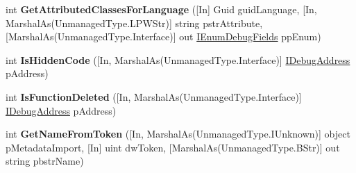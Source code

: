 \begin{DoxyCompactItemize}
\item 
\hypertarget{interface_microsoft_1_1_visual_studio_1_1_debugger_1_1_interop_e_e_1_1_i_debug_com_plus_symbol_provider_a0364f9bf56002f9768eb31fe6b69cfee}{int {\bfseries Get\+Attributed\+Classes\+For\+Language} (\mbox{[}In\mbox{]} Guid guid\+Language, \mbox{[}In, Marshal\+As(Unmanaged\+Type.\+L\+P\+W\+Str)\mbox{]} string pstr\+Attribute, \mbox{[}Marshal\+As(Unmanaged\+Type.\+Interface)\mbox{]} out \hyperlink{interface_microsoft_1_1_visual_studio_1_1_debugger_1_1_interop_e_e_1_1_i_enum_debug_fields}{I\+Enum\+Debug\+Fields} pp\+Enum)}\label{interface_microsoft_1_1_visual_studio_1_1_debugger_1_1_interop_e_e_1_1_i_debug_com_plus_symbol_provider_a0364f9bf56002f9768eb31fe6b69cfee}

\item 
\hypertarget{interface_microsoft_1_1_visual_studio_1_1_debugger_1_1_interop_e_e_1_1_i_debug_com_plus_symbol_provider_a13a45066914bd23fd6bf565db2a4e9d3}{int {\bfseries Is\+Hidden\+Code} (\mbox{[}In, Marshal\+As(Unmanaged\+Type.\+Interface)\mbox{]} \hyperlink{interface_microsoft_1_1_visual_studio_1_1_debugger_1_1_interop_e_e_1_1_i_debug_address}{I\+Debug\+Address} p\+Address)}\label{interface_microsoft_1_1_visual_studio_1_1_debugger_1_1_interop_e_e_1_1_i_debug_com_plus_symbol_provider_a13a45066914bd23fd6bf565db2a4e9d3}

\item 
\hypertarget{interface_microsoft_1_1_visual_studio_1_1_debugger_1_1_interop_e_e_1_1_i_debug_com_plus_symbol_provider_ad88d5656edfe7c762bbac83290fafec1}{int {\bfseries Is\+Function\+Deleted} (\mbox{[}In, Marshal\+As(Unmanaged\+Type.\+Interface)\mbox{]} \hyperlink{interface_microsoft_1_1_visual_studio_1_1_debugger_1_1_interop_e_e_1_1_i_debug_address}{I\+Debug\+Address} p\+Address)}\label{interface_microsoft_1_1_visual_studio_1_1_debugger_1_1_interop_e_e_1_1_i_debug_com_plus_symbol_provider_ad88d5656edfe7c762bbac83290fafec1}

\item 
\hypertarget{interface_microsoft_1_1_visual_studio_1_1_debugger_1_1_interop_e_e_1_1_i_debug_com_plus_symbol_provider_a2470220c7dc74e5a33dcca6ddd420598}{int {\bfseries Get\+Name\+From\+Token} (\mbox{[}In, Marshal\+As(Unmanaged\+Type.\+I\+Unknown)\mbox{]} object p\+Metadata\+Import, \mbox{[}In\mbox{]} uint dw\+Token, \mbox{[}Marshal\+As(Unmanaged\+Type.\+B\+Str)\mbox{]} out string pbstr\+Name)}\label{interface_microsoft_1_1_visual_studio_1_1_debugger_1_1_interop_e_e_1_1_i_debug_com_plus_symbol_provider_a2470220c7dc74e5a33dcca6ddd420598}


\end{DoxyCompactItemize}
